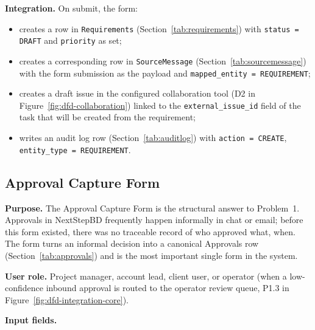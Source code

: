 \documentclass[12pt,a4paper]{report}
\begin{document}
\textbf{Integration.} On submit, the form:
\begin{itemize}[leftmargin=1.6em]
    \item creates a row in \texttt{Requirements} (Section~\ref{tab:requirements})
          with \texttt{status = DRAFT} and \texttt{priority} as set;
    \item creates a corresponding row in \texttt{SourceMessage}
          (Section~\ref{tab:sourcemessage}) with the form submission as the
          payload and \texttt{mapped\_entity = REQUIREMENT};
    \item creates a draft issue in the configured collaboration tool (D2 in
          Figure~\ref{fig:dfd-collaboration}) linked to the
          \texttt{external\_issue\_id} field of the task that will be created
          from the requirement;
    \item writes an audit log row (Section~\ref{tab:auditlog}) with
          \texttt{action = CREATE}, \texttt{entity\_type = REQUIREMENT}.
\end{itemize}

\subsection{Approval Capture Form}
\label{sec:form-approval}

\textbf{Purpose.} The Approval Capture Form is the structural answer to
Problem~1. Approvals in NextStepBD frequently happen informally in chat or
email; before this form existed, there was no traceable record of who
approved what, when. The form turns an informal decision into a canonical
Approvals row (Section~\ref{tab:approvals}) and is the most important
single form in the system.

\textbf{User role.} Project manager, account lead, client user, or operator
(when a low-confidence inbound approval is routed to the operator review
queue, P1.3 in Figure~\ref{fig:dfd-integration-core}).

\textbf{Input fields.}
\end{document}

